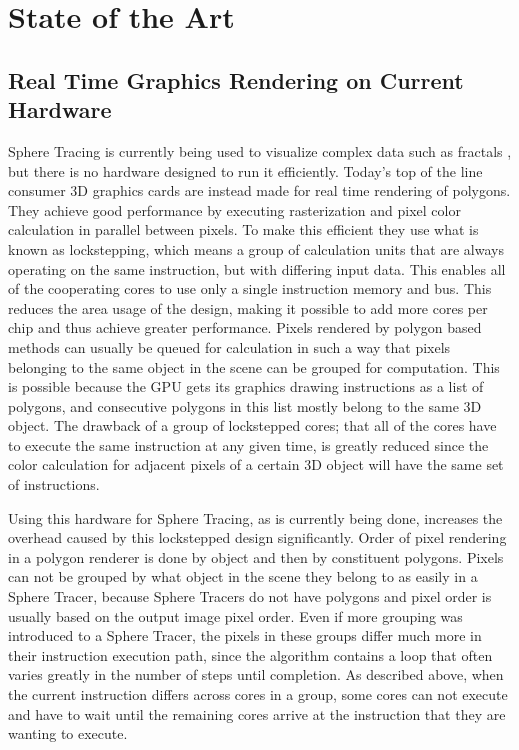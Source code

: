 \chapter{State of the Art}

	\section{ Real Time Graphics Rendering on Current Hardware } 

		Sphere Tracing is currently being used to visualize complex data such
		as fractals \cite{JONATHANGRANSKOG2017}, but there is no hardware
		designed to run	it efficiently. Today's top of the line consumer 3D
		graphics cards are instead made for real time rendering of
		polygons\cite{Houston2010}. They achieve good performance by
		executing rasterization and pixel color calculation in parallel
		between pixels. To make this efficient they use what is known as
		lockstepping, which means a group of calculation units that are
		always operating on the same instruction, but with differing input
		data. This enables all of the cooperating cores to use only a single
		instruction memory and bus. This reduces the area usage of the
		design, making it possible to add more cores per chip and thus
		achieve greater performance. Pixels rendered by polygon based methods
		can usually be queued for calculation in such a way that pixels
		belonging to the same object in the scene can be grouped for
		computation. This is possible because the GPU gets its graphics
		drawing instructions as a list of polygons, and consecutive polygons
		in this list mostly belong to the same 3D object. The drawback of a
		group of lockstepped cores; that all of the cores have to execute the
		same instruction at any given time, is greatly reduced since the
		color calculation for adjacent pixels of a certain 3D object will
		have the same set of instructions.
		
		Using this hardware for Sphere Tracing, as is currently being done,
		increases the overhead caused by this lockstepped design significantly.
		Order of pixel rendering in a polygon renderer is done by object and
		then by constituent polygons. Pixels can not be grouped by what object
		in the scene they belong to as easily in a Sphere Tracer, because Sphere
		Tracers do not have polygons and pixel order is usually based on the
		output image pixel order. Even if more grouping was introduced to a
		Sphere Tracer, the pixels in these groups differ much more in their
		instruction execution path, since the algorithm contains a loop that
		often varies greatly in the number of steps until completion. As
		described above, when the current instruction differs across cores in a
		group, some cores can not execute and have to wait until the remaining
		cores arrive at the instruction that they are wanting to execute.
		
